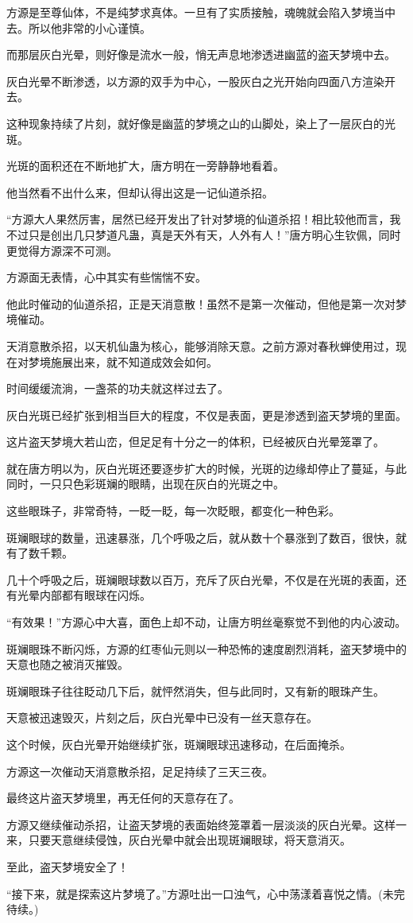 \begin{this_body}
方源是至尊仙体，不是纯梦求真体。一旦有了实质接触，魂魄就会陷入梦境当中去。所以他非常的小心谨慎。

而那层灰白光晕，则好像是流水一般，悄无声息地渗透进幽蓝的盗天梦境中去。

灰白光晕不断渗透，以方源的双手为中心，一股灰白之光开始向四面八方渲染开去。

这种现象持续了片刻，就好像是幽蓝的梦境之山的山脚处，染上了一层灰白的光斑。

光斑的面积还在不断地扩大，唐方明在一旁静静地看着。

他当然看不出什么来，但却认得出这是一记仙道杀招。

“方源大人果然厉害，居然已经开发出了针对梦境的仙道杀招！相比较他而言，我不过只是创出几只梦道凡蛊，真是天外有天，人外有人！”唐方明心生钦佩，同时更觉得方源深不可测。

方源面无表情，心中其实有些惴惴不安。

他此时催动的仙道杀招，正是天消意散！虽然不是第一次催动，但他是第一次对梦境催动。

天消意散杀招，以天机仙蛊为核心，能够消除天意。之前方源对春秋蝉使用过，现在对梦境施展出来，就不知道成效会如何。

时间缓缓流淌，一盏茶的功夫就这样过去了。

灰白光斑已经扩张到相当巨大的程度，不仅是表面，更是渗透到盗天梦境的里面。

这片盗天梦境大若山峦，但足足有十分之一的体积，已经被灰白光晕笼罩了。

就在唐方明以为，灰白光斑还要逐步扩大的时候，光斑的边缘却停止了蔓延，与此同时，一只只色彩斑斓的眼睛，出现在灰白的光斑之中。

这些眼珠子，非常奇特，一眨一眨，每一次眨眼，都变化一种色彩。

斑斓眼球的数量，迅速暴涨，几个呼吸之后，就从数十个暴涨到了数百，很快，就有了数千颗。

几十个呼吸之后，斑斓眼球数以百万，充斥了灰白光晕，不仅是在光斑的表面，还有光晕内部都有眼球在闪烁。

“有效果！”方源心中大喜，面色上却不动，让唐方明丝毫察觉不到他的内心波动。

斑斓眼珠不断闪烁，方源的红枣仙元则以一种恐怖的速度剧烈消耗，盗天梦境中的天意也随之被消灭摧毁。

斑斓眼珠子往往眨动几下后，就怦然消失，但与此同时，又有新的眼珠产生。

天意被迅速毁灭，片刻之后，灰白光晕中已没有一丝天意存在。

这个时候，灰白光晕开始继续扩张，斑斓眼球迅速移动，在后面掩杀。

方源这一次催动天消意散杀招，足足持续了三天三夜。

最终这片盗天梦境里，再无任何的天意存在了。

方源又继续催动杀招，让盗天梦境的表面始终笼罩着一层淡淡的灰白光晕。这样一来，只要天意继续侵蚀，灰白光晕中就会出现斑斓眼球，将天意消灭。

至此，盗天梦境安全了！

“接下来，就是探索这片梦境了。”方源吐出一口浊气，心中荡漾着喜悦之情。(未完待续。)

\end{this_body}

